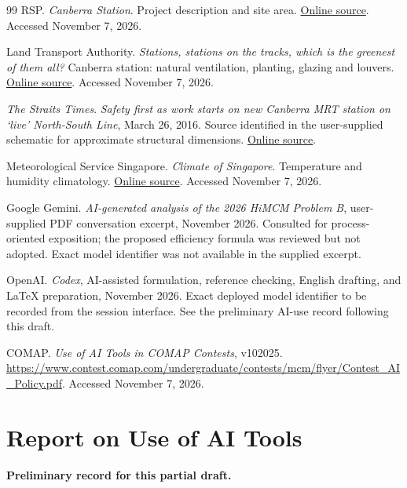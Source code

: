 \documentclass[12pt]{article}
\begin{document}
\begin{thebibliography}{99}
RSP. \emph{Canberra Station}. Project description and site area.
\href{https://rsp.design/project/canberrastation/}{Online source}. Accessed November 7, 2026.

Land Transport Authority. \emph{Stations, stations on the tracks, which is the greenest of them all?}
Canberra station: natural ventilation, planting, glazing and louvers.
\href{https://www.lta.gov.sg/content/ltagov/en/who_we_are/statistics_and_publications/Connect/greenmrtstations.html}{Online source}.
Accessed November 7, 2026.

\emph{The Straits Times}. \emph{Safety first as work starts on new Canberra MRT station on `live' North-South Line}, March 26, 2016.
Source identified in the user-supplied schematic for approximate structural dimensions.
\href{https://www.straitstimes.com/singapore/safety-first-as-work-starts-on-new-canberra-mrt-station-on-live-north-south-line}{Online source}.

Meteorological Service Singapore. \emph{Climate of Singapore}. Temperature and humidity climatology.
\href{https://www.weather.gov.sg/climate-climate-of-singapore}{Online source}. Accessed November 7, 2026.

Google Gemini. \emph{AI-generated analysis of the 2026 HiMCM Problem B},
user-supplied PDF conversation excerpt, November 2026.
Consulted for process-oriented exposition; the proposed efficiency formula was
reviewed but not adopted. Exact model identifier was not available in the supplied excerpt.

OpenAI. \emph{Codex}, AI-assisted formulation, reference checking,
English drafting, and LaTeX preparation, November 2026.
Exact deployed model identifier to be recorded from the session interface.
See the preliminary AI-use record following this draft.

COMAP. \emph{Use of AI Tools in COMAP Contests}, v102025.
\url{https://www.contest.comap.com/undergraduate/contests/mcm/flyer/Contest_AI_Policy.pdf}.
Accessed November 7, 2026.
\end{thebibliography}

\clearpage
{}
{}
\section*{Report on Use of AI Tools}
\noindent\textbf{Preliminary record for this partial draft.}
\end{document}
